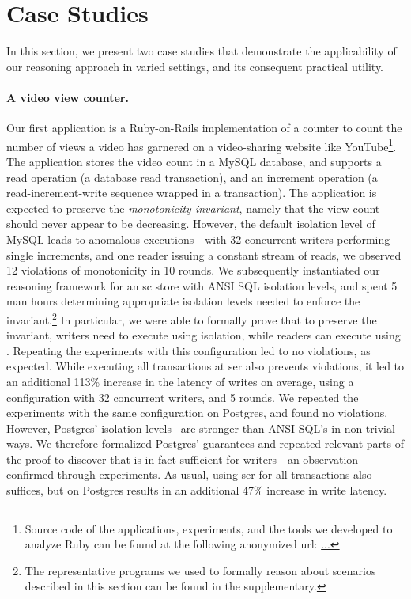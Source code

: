 \section{Case Studies}
\label{sec:case-studies}

In this section, we present two case studies that demonstrate the
applicability of our reasoning approach in varied settings, and its
consequent practical utility.

\paragraph{A video view counter.} Our first application is a
Ruby-on-Rails implementation of a counter to count the number of views
a video has garnered on a video-sharing website like
YouTube\footnote{Source code of the applications, experiments, and the
  tools we developed to analyze Ruby can be found at the following
  anonymized url: \url{...}}. The application stores the video count
in a MySQL database, and supports a read operation (a database read
transaction), and an increment operation (a read-increment-write
sequence wrapped in a transaction). The application is expected to
preserve the \emph{monotonicity invariant}, namely that the view count
should never appear to be decreasing. However, the default
 isolation level of MySQL leads to anomalous
executions - with 32 concurrent writers performing single increments,
and one reader issuing a constant stream of reads, we observed 12
violations of monotonicity in 10 rounds. We subsequently instantiated
our reasoning framework for an {\sc sc} store with ANSI SQL isolation
levels, and spent 5 man hours determining appropriate isolation levels
needed to enforce the invariant.\footnote{The representative \txnimp
  programs we used to formally reason about scenarios described in
  this section can be found in the supplementary.} In particular, we
were able to formally prove that to preserve the invariant, writers
need to execute using  isolation, while readers can
execute using . Repeating the experiments with
this configuration led to no violations, as expected. While executing
all transactions at {\sc ser} also prevents violations, it led to an
additional 113\% increase in the latency of writes on average, using a
configuration with 32 concurrent writers, and 5 rounds. We repeated
the experiments with the same configuration on Postgres, and found no
violations. However, Postgres' isolation levels~\cite{postgresiso} are
stronger than ANSI SQL's in non-trivial ways. We therefore formalized
Postgres' guarantees and repeated relevant parts of the proof to
discover that  is in fact sufficient for writers
- an observation confirmed through experiments. As usual, using {\sc
  ser} for all transactions also suffices, but on Postgres results in
an additional 47\% increase in write latency.



